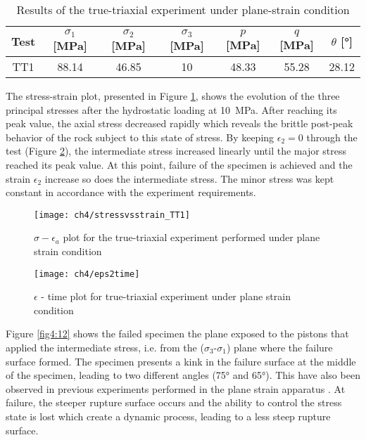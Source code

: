 \begin{table}
    \centering
    \begin{tabular}{ccccccc}
        \hline
        Test & $\sigma_1$ [\si{MPa}] & $\sigma_2$ [\si{MPa}] & $\sigma_3$ [\si{MPa}] & $p$ [\si{MPa}] & $q$ [\si{MPa}] & $\theta$ [\si{\degree}] \\
        \hline
        \hline
        TT1 &88.14 & 46.85 & 10 & 48.33 & 55.28 & 28.12 \\
        \hline
    \end{tabular}
    \caption{Results of the true-triaxial experiment under plane-strain condition}
    \label{tb4:TT1}
\end{table}

The stress-strain plot, presented in Figure \ref{fig4:10}, shows the evolution of the three principal stresses after the hydrostatic loading at \SI{10}{MPa}. After reaching its peak value, the axial stress decreased rapidly which reveals the brittle post-peak behavior of the rock subject to this state of stress.  By keeping $\epsilon_2 = 0$  through the test (Figure \ref{fig4:11}), the intermediate stress increased linearly until the major stress reached its peak value. At this point, failure of the specimen is achieved and the strain $\epsilon_2$ increase so does the intermediate stress. The minor stress was kept constant in accordance with the experiment requirements.

\begin{figure}[tb]
    \centering
    \texttt{[image: ch4/stressvsstrain\_TT1]}
    \caption{$\sigma-\epsilon_a$ plot for the true-triaxial experiment performed under plane strain condition}
    \label{fig4:10}
\end{figure} 


\begin{figure}[tb]
    \centering
    \texttt{[image: ch4/eps2time]}
    \caption{$\epsilon$ - time plot for true-triaxial experiment under plane strain condition}
    \label{fig4:11}
\end{figure} 

Figure \ref{fig4:12} shows the failed specimen the plane exposed to the pistons that applied the intermediate stress, i.e. from the ($\sigma_3$-$\sigma_1$) plane where the failure surface formed. The specimen presents a kink in the failure surface at the middle of the specimen, leading to two different angles (\ang{75} and \ang{65}). This have also been observed in previous experiments performed in the plane strain apparatus \cite{Labuz1996}. At failure, the steeper rupture surface occurs and the ability to control the stress state is lost which create a dynamic process, leading to a less steep rupture surface. 

